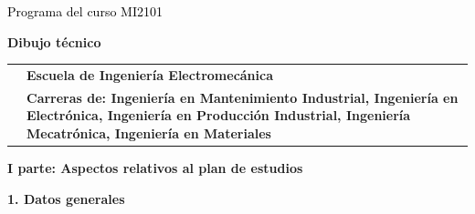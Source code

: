 \documentclass[letterpaper]{article}%
\begin{document}
%
\normalsize%
\thispagestyle{empty}%
%
\vspace*{100mm}%
\par\fontsize{14}{0}\selectfont \textcolor{black}{Programa del curso MI2101}%
\par\fontsize{18}{25}\selectfont \textbf{\textcolor{azulsuaveTEC}{Dibujo técnico}}%
\vspace*{15mm}%
\newline%
\begin{tabularx}{\textwidth}{m{}m{}}%
&\hspace*{0mm}\fontsize{12}{0}\selectfont \textbf{\textcolor{gris}{Escuela de Ingeniería Electromecánica}}\\%
[-12pt]%
&\hspace*{0mm}\fontsize{12}{0}\selectfont \textbf{\textcolor{gris}{Carreras de: Ingeniería en Mantenimiento Industrial, Ingeniería en Electrónica, Ingeniería en Producción Industrial, Ingeniería Mecatrónica, Ingeniería en Materiales}}\\%
\end{tabularx}%
\newpage%
\pagestyle{headfoot}%
\par\fontsize{14}{0}\selectfont \textbf{\textcolor{parte}{I parte: Aspectos relativos al plan de estudios}}%
\par\hspace*{2mm}\fontsize{12}{14}\selectfont \textbf{\textcolor{parte}{1. Datos generales}}%
\vspace*{3mm}%
\newline%
\fontsize{10}{12}\selectfont %
\end{document}
